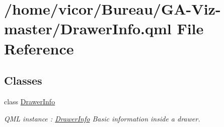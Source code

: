 \hypertarget{_drawer_info_8qml}{}\section{/home/vicor/\+Bureau/\+G\+A-\/\+Viz-\/master/\+Drawer\+Info.qml File Reference}
\label{_drawer_info_8qml}
\subsection*{Classes}
\begin{DoxyCompactItemize}
\item 
class \hyperlink{class_drawer_info}{Drawer\+Info}
\begin{DoxyCompactList}\small\item\em Q\+ML instance \+: \hyperlink{class_drawer_info}{Drawer\+Info} Basic information inside a drawer. \end{DoxyCompactList}\end{DoxyCompactItemize}

